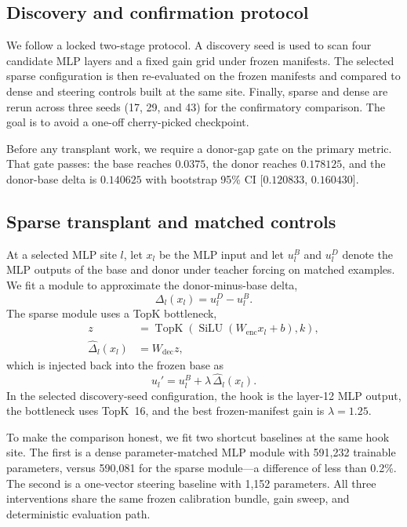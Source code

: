 \documentclass{article}
\begin{document}
\subsection{Discovery and confirmation protocol}
We follow a locked two-stage protocol. A discovery seed is used to scan four candidate MLP layers and a fixed gain grid under frozen manifests. The selected sparse configuration is then re-evaluated on the frozen manifests and compared to dense and steering controls built at the same site. Finally, sparse and dense are rerun across three seeds (17, 29, and 43) for the confirmatory comparison. The goal is to avoid a one-off cherry-picked checkpoint.

Before any transplant work, we require a donor-gap gate on the primary metric. That gate passes: the base reaches $0.0375$, the donor reaches $0.178125$, and the donor-base delta is $0.140625$ with bootstrap 95\% CI [$0.120833$, $0.160430$].

\subsection{Sparse transplant and matched controls}
At a selected MLP site $l$, let $x_l$ be the MLP input and let $u_l^B$ and $u_l^D$ denote the MLP outputs of the base and donor under teacher forcing on matched examples. We fit a module to approximate the donor-minus-base delta,
\begin{equation}
\Delta_l(x_l) = u_l^D - u_l^B.
\end{equation}
The sparse module uses a TopK bottleneck,
\begin{align}
 z &= \operatorname{TopK}(\operatorname{SiLU}(W_{\mathrm{enc}} x_l + b), k), \\
 \widehat{\Delta}_l(x_l) &= W_{\mathrm{dec}} z,
\end{align}
which is injected back into the frozen base as
\begin{equation}
 u_l' = u_l^B + \lambda\,\widehat{\Delta}_l(x_l).
\end{equation}
In the selected discovery-seed configuration, the hook is the layer-12 MLP output, the bottleneck uses TopK~16, and the best frozen-manifest gain is $\lambda=1.25$.

To make the comparison honest, we fit two shortcut baselines at the same hook site. The first is a dense parameter-matched MLP module with 591,232 trainable parameters, versus 590,081 for the sparse module---a difference of less than 0.2\%. The second is a one-vector steering baseline with 1,152 parameters. All three interventions share the same frozen calibration bundle, gain sweep, and deterministic evaluation path.
\end{document}
